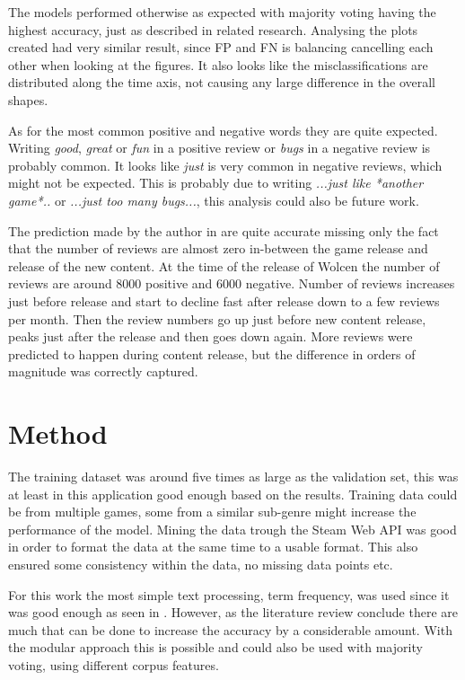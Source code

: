 The models performed otherwise as expected with majority voting having the highest accuracy, just as described in related research. 
Analysing the plots created had very similar result, since FP and FN is balancing cancelling each other when looking at the figures. 
It also looks like the misclassifications are distributed along the time axis, not causing any large difference in the overall shapes. 


As for the most common positive and negative words they are quite expected. 
Writing \emph{good}, \emph{great} or \emph{fun} in a positive review or \emph{bugs} in a negative review is probably common. 
It looks like \emph{just} is very common in negative reviews, which might not be expected. 
This is probably due to writing \emph{...just like *another game*..} or \emph{...just too many bugs...}, this analysis could also be future work.


The prediction made by the author in  are quite accurate missing only the fact that the number of reviews are almost zero in-between the game release and release of the new content. 
At the time of the release of Wolcen the number of reviews are around 8000 positive and 6000 negative. 
Number of reviews increases just before release and start to decline fast after release down to a few reviews per month. 
Then the review numbers go up just before new content release, peaks just after the release and then goes down again. 
More reviews were predicted to happen during content release, but the difference in orders of magnitude was correctly captured. 


\section{Method}
\label{sec:discussion-method}


The training dataset was around five times as large as the validation set, this was at least in this application good enough based on the results. 
Training data could be from multiple games, some from a similar sub-genre might increase the performance of the model. 
Mining the data trough the Steam Web API was good in order to format the data at the same time to a usable format. 
This also ensured some consistency within the data, no missing data points etc. 


For this work the most simple text processing, term frequency, was used since it was good enough as seen in . 
However, as the literature review conclude there are much that can be done to increase the accuracy by a considerable amount. 
With the modular approach this is possible and could also be used with majority voting, using different corpus features. 



